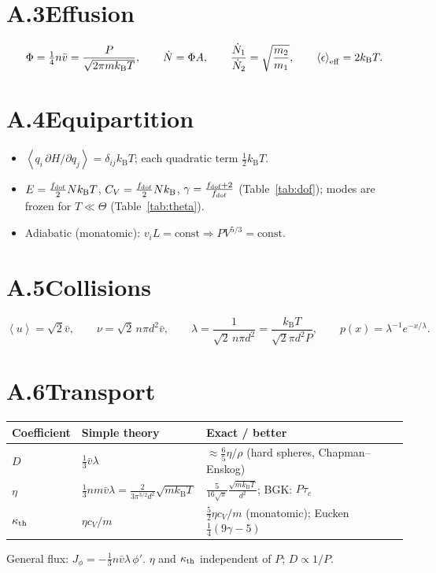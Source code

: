\documentclass[11pt,a4paper]{report}
\theoremstyle{definition}
\theoremstyle{plain}
\newcommand{\kB}{k_{\mathrm{B}}}
\newcommand{\avg}[1]{\left\langle #1\right\rangle}
\newcommand{\vbar}{\bar{v}}
\begin{document}
\section*{A.3\quad Effusion}
\[
\Phi=\tfrac14n\vbar=\frac{P}{\sqrt{2\pi m\kB T}},\qquad\dot N=\Phi A,\qquad\frac{\dot N_1}{\dot N_2}=\sqrt{\frac{m_2}{m_1}},\qquad\avg{\epsilon}_{\rm eff}=2\kB T.
\]

\section*{A.4\quad Equipartition}
\begin{itemize}[nosep]
\item $\avg{q_i\,\partial H/\partial q_j}=\delta_{ij}\kB T$; each quadratic term $\tfrac12\kB T$.
\item $E=\tfrac{f_{\rm dof}}2N\kB T$, $C_V=\tfrac{f_{\rm dof}}{2}N\kB$, $\gamma=\tfrac{f_{\rm dof}+2}{f_{\rm dof}}$ (Table~\ref{tab:dof}); modes are frozen for $T\ll\Theta$ (Table~\ref{tab:theta}).
\item Adiabatic (monatomic): $v_iL=\text{const}\Rightarrow PV^{5/3}=\text{const}$.
\end{itemize}

\section*{A.5\quad Collisions}
\[
\avg u=\sqrt2\vbar,\qquad\nu=\sqrt2\,n\pi d^2\vbar,\qquad\lambda=\frac{1}{\sqrt2\,n\pi d^2}=\frac{\kB T}{\sqrt2\pi d^2P},\qquad p(x)=\lambda^{-1}e^{-x/\lambda}.
\]

\section*{A.6\quad Transport}
\begin{center}
\begin{tabular}{@{}lll@{}}
\toprule
Coefficient & Simple theory & Exact / better\\
\midrule
$D$ & $\tfrac13\vbar\lambda$ & $\approx\tfrac{6}{5}\eta/\rho$ (hard spheres, Chapman--Enskog)\\
$\eta$ & $\tfrac13nm\vbar\lambda=\tfrac{2}{3\pi^{3/2}d^2}\sqrt{m\kB T}$ & $\tfrac{5}{16\sqrt\pi}\tfrac{\sqrt{m\kB T}}{d^2}$; BGK: $P\tau_c$\\
$\kappa_{\rm th}$ & $\eta c_V/m$ & $\tfrac52\eta c_V/m$ (monatomic); Eucken $\tfrac14(9\gamma-5)$\\
\bottomrule
\end{tabular}
\end{center}
General flux: $J_\phi=-\tfrac13n\vbar\lambda\,\phi'$. $\eta$ and $\kappa_{\rm th}$ independent of $P$; $D\propto1/P$.
\end{document}
